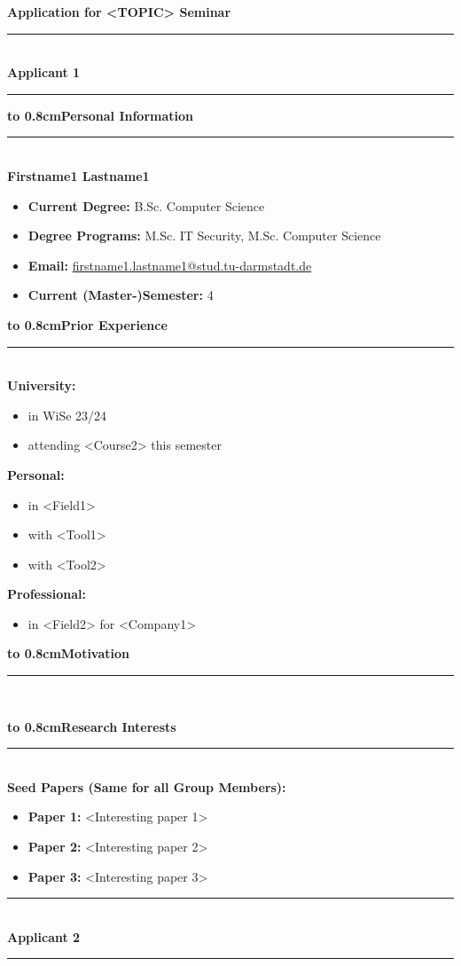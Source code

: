 \documentclass[
    USenglish,
    accentcolor=3b,
]{tudaexercise}
\newcommand{\fat}[1]{{\Large\textbf{\textcolor{accentcolor}{\textsf{#1}}}}}
\newcommand{\iconpsection}[2]{%
    \mbox{}\fat{\hbox to 0.8cm{#1}#2}%
    \vspace{-1.2em}\par\noindent\rule{\textwidth}{0.4pt}\\[1em]
}
\newcommand{\applicant}[1]{%
\rule{\textwidth}{0.4pt}\\[.4ex]%
{\LARGE\bfseries Applicant #1}\\[-1.2ex]%
\rule{\textwidth}{0.4pt}%
}
\newcommand{\seedpapers}{
    \begin{defBox}
        \begin{itemize}
            \item \textbf{Paper 1:} <Interesting paper 1>
            \item \textbf{Paper 2:} <Interesting paper 2>
            \item \textbf{Paper 3:} <Interesting paper 3>
        \end{itemize}
    \end{defBox}
}
\begin{document}
    \sffamily%
    \textbf{\Huge Application for <TOPIC> Seminar}%
    \vspace{2em}

    \applicant{1}\label{applicant1}%
    \vspace{1em}

    \iconpsection{\faUser}{Personal Information}
    \textbf{\large Firstname1 Lastname1}
    \begin{itemize}
        \item \textbf{Current Degree:} B.Sc. Computer Science
        \item \textbf{Degree Programs:} M.Sc. IT Security, M.Sc. Computer Science
        \item \textbf{Email:} \href{mailto:firstname1.lastname1@stud.tu-darmstadt.de}{firstname1.lastname1@stud.tu-darmstadt.de}
        \item \textbf{Current (Master-)Semester:} 4
    \end{itemize}

    \iconpsection{\faGraduationCap}{Prior Experience}
    \textbf{University:}
    \begin{itemize}[itemsep=-.5em]
        \item <Course1> in WiSe 23/24
        \item attending <Course2> this semester
    \end{itemize}
    \textbf{Personal:}
    \begin{itemize}[itemsep=-.5em]
        \item <Experience1> in <Field1>
        \item <Experience2> with <Tool1>
        \item <Experience3> with <Tool2>
    \end{itemize}
    \textbf{Professional:}
    \begin{itemize}[itemsep=-.5em]
        \item <Experience4> in <Field2> for <Company1>
    \end{itemize}
    \iconpsection{\faClipboard}{Motivation}
    \lipsum[1]

    \iconpsection{\faBook}{Research Interests}
    \textbf{Seed Papers (Same for all Group Members):}
    \seedpapers{}
    \clearpage{}
    \applicant{2}\label{applicant2}%
    \vspace{1em}
\end{document}

